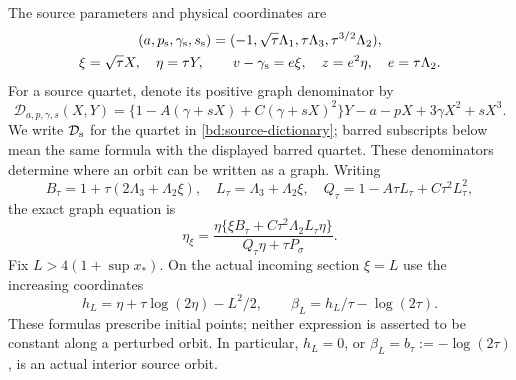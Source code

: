 The source parameters and physical coordinates are
\begin{equation}\label{bd:source-dictionary}
\begin{gathered}
 (a,p_{\rm s},\gamma_{\rm s},s_{\rm s})
 =(-1,\sqrt\tau\Lambda_1,\tau\Lambda_3,\tau^{3/2}\Lambda_2),\\
 \xi=\sqrt\tau X,\quad\eta=\tau Y,\qquad
 v-\gamma_{\rm s}=e\xi,\quad z=e^2\eta,\quad e=\tau\Lambda_2.
\end{gathered}
\end{equation}
For a source quartet, denote its positive graph denominator by
\[
 \mathcal D_{a,p,\gamma,s}(X,Y)
 =\{1-A(\gamma+sX)+C(\gamma+sX)^2\}Y
       -a-pX+3\gamma X^2+sX^3.
\]
We write \(\mathcal D_{\rm s}\) for the quartet in
\eqref{bd:source-dictionary}; barred subscripts below mean the same
formula with the displayed barred quartet. These denominators determine
where an orbit can be written as a graph.
Writing
\[
 B_\tau=1+\tau(2\Lambda_3+\Lambda_2\xi),\quad
 L_\tau=\Lambda_3+\Lambda_2\xi,\quad
 Q_\tau=1-A\tau L_\tau+C\tau^2L_\tau^2,
\]
the exact graph equation is
\begin{equation}\label{bd:graph}
 \eta_\xi=
 \frac{\eta\{\xi B_\tau+C\tau^2\Lambda_2L_\tau\eta\}}
      {Q_\tau\eta+\tau P_\sigma}.
\end{equation}
Fix \(L>4(1+\sup x_*)\).  On the actual incoming section \(\xi=L\)
use the increasing coordinates
\begin{equation}\label{bd:incoming-phase}
 h_L=\eta+\tau\log(2\eta)-L^2/2,
 \qquad \beta_L=h_L/\tau-\log(2\tau).
\end{equation}
These formulas prescribe initial points; neither expression is asserted
to be constant along a perturbed orbit.  In particular,
\(h_L=0\), or \(\beta_L=b_\tau:=-\log(2\tau)\), is an actual
interior source orbit.

